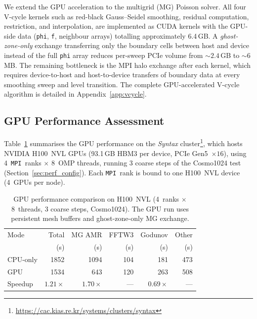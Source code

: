 \documentclass[fleqn,usenatbib]{mnras}
\newcommand{\code}[1]{\texttt{#1}}
\newcommand{\mpi}[0]{\texttt{MPI}}
\begin{document}
We extend the GPU acceleration to the multigrid (MG) Poisson solver.
All four V-cycle kernels such as red-black Gauss--Seidel smoothing,
residual computation, restriction, and interpolation, are implemented
as CUDA kernels with the GPU-side data (\code{phi}, \code{f},
neighbour arrays) totalling approximately 6.4\,GB.
A \emph{ghost-zone-only} exchange transferring only the boundary cells
between host and device instead of the full \code{phi} array reduces
per-sweep PCIe volume from ${\sim}2.4$\,GB to ${\sim}6$\,MB.
The remaining bottleneck is the MPI halo exchange after each kernel,
which requires device-to-host and host-to-device transfers of
boundary data at every smoothing sweep and level transition.
The complete GPU-accelerated V-cycle algorithm is detailed in
Appendix~\ref{app:vcycle}.

\subsection{GPU Performance Assessment}
\label{sec:hybrid_perf}

Table~\ref{tab:gpu_perf} summarises the GPU performance on the
\textit{Syntax} cluster\footnote{\url{https://cac.kias.re.kr/systems/clusters/syntax}}, which hosts NVIDIA H100~NVL GPUs
(93.1\,GB HBM3 per device, PCIe Gen5~$\times 16$), using 4~\mpi\ ranks
$\times$ 8~OMP threads, running 3 coarse steps of the Cosmo1024
test (Section~\ref{sec:perf_config}).  Each \mpi\ rank is bound to
one H100~NVL device (4~GPUs per node).

\begin{table}
\centering
\caption{GPU performance comparison on H100~NVL (4~ranks $\times$
8~threads, 3 coarse steps, Cosmo1024).  The GPU run uses persistent
mesh buffers and ghost-zone-only MG exchange.}
\label{tab:gpu_perf}
\footnotesize
\begin{tabular}{@{}lrrrrr@{}}
\toprule
Mode & Total & MG AMR & FFTW3  & Godunov & Other \\
     & (s)   & (s)    & (s)        & (s)     & (s)   \\
\midrule
CPU-only   & 1852 & 1094 & 104 & 181 &  473 \\
GPU  & 1534 &  643 & 120 & 263 &  508 \\
\midrule
Speedup    & $1.21\times$ & $1.70\times$ & --- & $0.69\times$ & --- \\
\bottomrule
\end{tabular}
\end{table}
\end{document}
